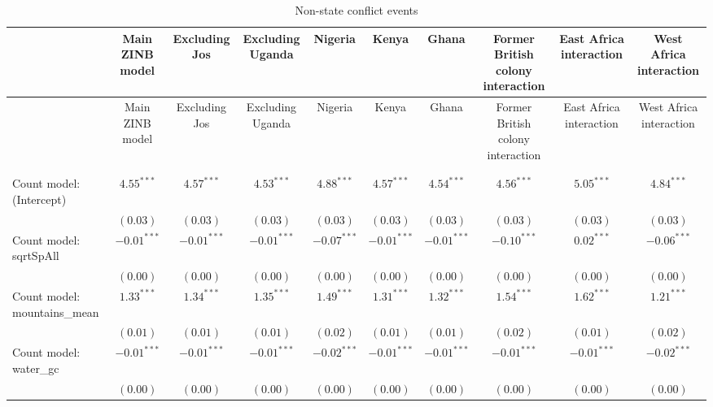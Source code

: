 
\begin{center}
\begin{longtable}{l c c c c c c c c c}
\toprule
 & Main ZINB model & Excluding Jos & Excluding Uganda & Nigeria & Kenya & Ghana & Former British colony interaction & East Africa
	    interaction & West Africa interaction \\
\midrule
\endfirsthead
\toprule
 & Main ZINB model & Excluding Jos & Excluding Uganda & Nigeria & Kenya & Ghana & Former British colony interaction & East Africa
	    interaction & West Africa interaction \\
\midrule
\endhead
\bottomrule
\endfoot
\bottomrule
\multicolumn{10}{l}{\scriptsize{$^{***}p<0.001$; $^{**}p<0.01$; $^{*}p<0.05$; $^{\cdot}p<0.1$}}\\
\caption{Non-state conflict events}
\label{znon_state}
\endlastfoot \\
Count model: (Intercept)       & $4.55^{***}$  & $4.57^{***}$  & $4.53^{***}$  & $4.88^{***}$    & $4.57^{***}$  & $4.54^{***}$    & $4.56^{***}$    & $5.05^{***}$  & $4.84^{***}$  \\
                               & $(0.03)$      & $(0.03)$      & $(0.03)$      & $(0.03)$        & $(0.03)$      & $(0.03)$        & $(0.03)$        & $(0.03)$      & $(0.03)$      \\
Count model: sqrtSpAll         & $-0.01^{***}$ & $-0.01^{***}$ & $-0.01^{***}$ & $-0.07^{***}$   & $-0.01^{***}$ & $-0.01^{***}$   & $-0.10^{***}$   & $0.02^{***}$  & $-0.06^{***}$ \\
                               & $(0.00)$      & $(0.00)$      & $(0.00)$      & $(0.00)$        & $(0.00)$      & $(0.00)$        & $(0.00)$        & $(0.00)$      & $(0.00)$      \\
Count model: mountains\_mean   & $1.33^{***}$  & $1.34^{***}$  & $1.35^{***}$  & $1.49^{***}$    & $1.31^{***}$  & $1.32^{***}$    & $1.54^{***}$    & $1.62^{***}$  & $1.21^{***}$  \\
                               & $(0.01)$      & $(0.01)$      & $(0.01)$      & $(0.02)$        & $(0.01)$      & $(0.01)$        & $(0.02)$        & $(0.01)$      & $(0.02)$      \\
Count model: water\_gc         & $-0.01^{***}$ & $-0.01^{***}$ & $-0.01^{***}$ & $-0.02^{***}$   & $-0.01^{***}$ & $-0.01^{***}$   & $-0.01^{***}$   & $-0.01^{***}$ & $-0.02^{***}$ \\
                               & $(0.00)$      & $(0.00)$      & $(0.00)$      & $(0.00)$        & $(0.00)$      & $(0.00)$        & $(0.00)$        & $(0.00)$      & $(0.00)$      \\

\end{longtable}
\end{center}

